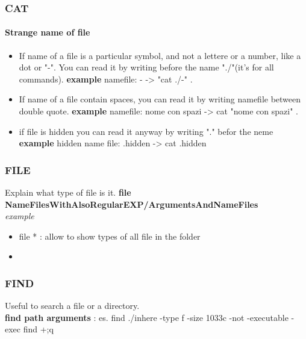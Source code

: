 \documentclass{article}
\begin{document}
                \subsubsection{CAT}
                    \paragraph{Strange name of file}
                    \begin{itemize}
                        \item  If name of a file is a particular symbol, and not a lettere or a number, like a dot or "-". You can read it by writing
                        before the name "./"(it's for all commands). \textbf{example} namefile: -  -> "cat ./-" .
                        \item If name of a file contain spaces, you can read it by writing namefile between  double quote. \textbf{example } namefile: nome con spazi -> cat "nome con spazi" . 
                        \item if file is hidden you can read it anyway by writing "." befor the neme \textbf{example} hidden name file: .hidden -> cat .hidden
            
                    \end{itemize}
                \subsubsection{FILE}
                    Explain what type of file is it. \textbf{file NameFilesWithAlsoRegularEXP/ArgumentsAndNameFiles} \\
                    \textit{example}
                    \begin{itemize}
                        \item file * : allow to show types of all file in the folder
                        \item 
                    \end{itemize} 
                \subsubsection{FIND}
                    Useful to search a file or a directory.\\
                    \textbf{find path arguments} : es. find ./inhere -type f -size  1033c -not -executable -exec find {} +;q
\end{document}
